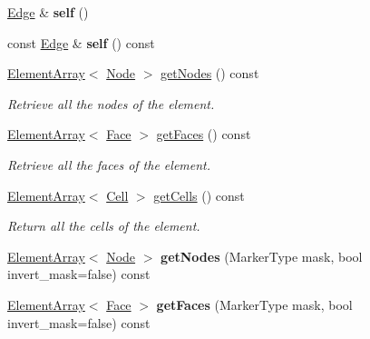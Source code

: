 \begin{DoxyCompactItemize}
\item 
\hypertarget{classINMOST_1_1Edge_ae49901107845bc2e4221018efea735bf}{\hyperlink{classINMOST_1_1Edge}{Edge} \& {\bfseries self} ()}\label{classINMOST_1_1Edge_ae49901107845bc2e4221018efea735bf}

\item 
\hypertarget{classINMOST_1_1Edge_a96dd80d27987140428b1f047e56d5549}{const \hyperlink{classINMOST_1_1Edge}{Edge} \& {\bfseries self} () const }\label{classINMOST_1_1Edge_a96dd80d27987140428b1f047e56d5549}

\item 
\hyperlink{classINMOST_1_1ElementArray}{Element\-Array}$<$ \hyperlink{classINMOST_1_1Node}{Node} $>$ \hyperlink{classINMOST_1_1Edge_a2e9e02817c50da41d366d9d89ff45bb8}{get\-Nodes} () const 
\begin{DoxyCompactList}\small\item\em Retrieve all the nodes of the element. \end{DoxyCompactList}\item 
\hyperlink{classINMOST_1_1ElementArray}{Element\-Array}$<$ \hyperlink{classINMOST_1_1Face}{Face} $>$ \hyperlink{classINMOST_1_1Edge_abfe4ce06477cfa404306c716d026d2ed}{get\-Faces} () const 
\begin{DoxyCompactList}\small\item\em Retrieve all the faces of the element. \end{DoxyCompactList}\item 
\hyperlink{classINMOST_1_1ElementArray}{Element\-Array}$<$ \hyperlink{classINMOST_1_1Cell}{Cell} $>$ \hyperlink{classINMOST_1_1Edge_ab38cdf43f623abcc12b0befbfac27b90}{get\-Cells} () const 
\begin{DoxyCompactList}\small\item\em Return all the cells of the element. \end{DoxyCompactList}\item 
\hypertarget{classINMOST_1_1Edge_a054c2768b16442babf7021046b3e6449}{\hyperlink{classINMOST_1_1ElementArray}{Element\-Array}$<$ \hyperlink{classINMOST_1_1Node}{Node} $>$ {\bfseries get\-Nodes} (Marker\-Type mask, bool invert\-\_\-mask=false) const }\label{classINMOST_1_1Edge_a054c2768b16442babf7021046b3e6449}

\item 
\hypertarget{classINMOST_1_1Edge_a62432abd01305826fa8506313b26a644}{\hyperlink{classINMOST_1_1ElementArray}{Element\-Array}$<$ \hyperlink{classINMOST_1_1Face}{Face} $>$ {\bfseries get\-Faces} (Marker\-Type mask, bool invert\-\_\-mask=false) const }\label{classINMOST_1_1Edge_a62432abd01305826fa8506313b26a644}


\end{DoxyCompactItemize}
